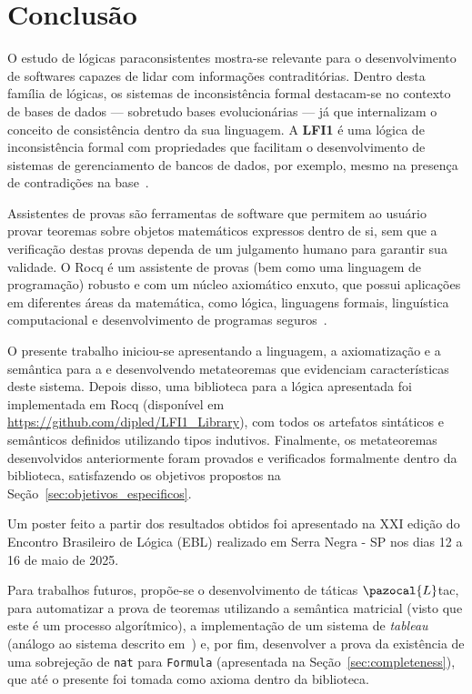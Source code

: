 \chapter{Conclusão}\label{chap:conclusao}

O estudo de lógicas paraconsistentes mostra-se relevante para o desenvolvimento de
softwares capazes de lidar com informações contraditórias. Dentro desta família de lógicas,
os sistemas de inconsistência formal destacam-se no contexto de bases de dados {---} sobretudo
bases evolucionárias {---} já que internalizam o conceito de consistência dentro da sua
linguagem. A \textbf{LFI1} é uma lógica de inconsistência formal com propriedades que facilitam o
desenvolvimento de sistemas de gerenciamento de bancos de dados, por exemplo, mesmo na
presença de contradições na base~\cite{carnielli2000formal}.

Assistentes de provas são ferramentas de software que permitem ao usuário provar
teoremas sobre objetos matemáticos expressos dentro de si, sem que a verificação destas provas dependa
de um julgamento humano para garantir sua validade. O Rocq é um assistente de provas (bem
como uma linguagem de programação) robusto e com um núcleo axiomático enxuto, que possui
aplicações em diferentes áreas da matemática, como lógica, linguagens formais, linguística
computacional e desenvolvimento de programas seguros~\cite{coqart}.

O presente trabalho iniciou-se apresentando a linguagem, a axiomatização e a semântica para a \lfium{} e desenvolvendo metateoremas que evidenciam características deste sistema. Depois disso, uma biblioteca para a lógica apresentada foi implementada em Rocq (disponível em \url{https://github.com/dipled/LFI1_Library}), com todos os artefatos sintáticos e semânticos definidos utilizando tipos indutivos. Finalmente, os metateoremas desenvolvidos anteriormente foram provados e verificados formalmente dentro da biblioteca, satisfazendo os objetivos propostos na Seção~\ref{sec:objetivos_especificos}.

Um poster feito a partir dos resultados obtidos foi apresentado na XXI edição do Encontro Brasileiro de Lógica (EBL) realizado em Serra Negra {-} SP nos dias 12 a 16 de maio de 2025.

Para trabalhos futuros, propõe-se o desenvolvimento de táticas $\pazocal{L}$tac, para automatizar a prova de teoremas utilizando a semântica matricial (visto que este é um processo algorítmico), a implementação de um sistema de \textit{tableau} (análogo ao sistema descrito em~\cite{tableaulfi}) e, por fim, desenvolver a prova da existência de uma sobrejeção de \texttt{nat} para \texttt{Formula} (apresentada na Seção~\ref{sec:completeness}), que até o presente foi tomada como axioma dentro da biblioteca.